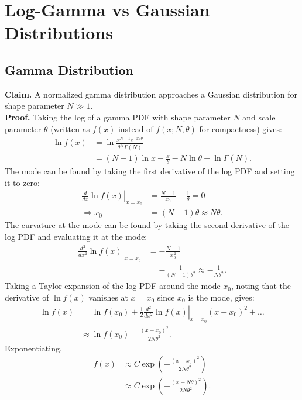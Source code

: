 \section{Log-Gamma vs Gaussian Distributions}
\label{sec:gamma_vs_gaussian}
\subsection{Gamma Distribution}
\noindent\textbf{Claim.} A normalized gamma distribution approaches a Gaussian distribution for shape parameter $N \gg 1$.\\

\noindent\textbf{Proof.} Taking the log of a gamma PDF with shape parameter $N$ and scale parameter $\theta$ (written as $f(x)$ instead of $f(x; N, \theta)$ for compactness) gives:
\begin{align}
    \ln f(x) &= \ln \frac{x^{N-1} e^{-x/\theta}}{\theta^N \Gamma(N)} \\[4pt]
     &= (N-1)\ln x - \frac{x}{\theta} - N\ln \theta - \ln \Gamma(N).
\end{align}
The mode can be found by taking the first derivative of the log PDF and setting it to zero:
\begin{align}
    \left.\frac{d}{dx} \ln f(x)\right|_{x=x_0} &= \frac{N-1}{x_0} - \frac{1}{\theta} = 0 \\[4pt]
    \Rightarrow x_0 &= (N-1)\theta \approx N\theta.
\end{align}
The curvature at the mode can be found by taking the second derivative of the log PDF and evaluating it at the mode:
\begin{align}
    \left.\frac{d^2}{dx^2} \ln f(x)\right|_{x=x_0} &= -\frac{N-1}{x_0^2} \\[4pt]
    &=-\frac{1}{(N-1)\theta^2} \approx -\frac{1}{N\theta^2}.
\end{align}
Taking a Taylor expansion of the log PDF around the mode $x_0$, noting that the derivative of $\ln f(x)$ vanishes at $x = x_0$ since $x_0$ is the mode, gives:
\begin{align}
    \ln f(x) &= \ln f(x_0) + \frac{1}{2} \left.\frac{d^2}{dx^2} \ln f(x)\right|_{x=x_0} (x - x_0)^2 + \dots \\[4pt]
    &\approx \ln f(x_0) - \frac{(x - x_0)^2}{2N\theta^2}.
\end{align}
Exponentiating,
\begin{align}
    f(x) &\approx C \exp\left(-\frac{(x - x_0)^2}{2N\theta^2}\right) \\[4pt]
    &\approx C \exp\left(-\frac{(x - N\theta)^2}{2N\theta^2}\right).
\end{align}

